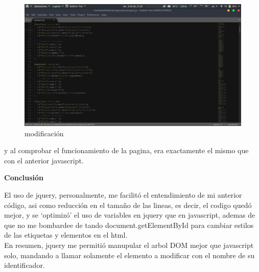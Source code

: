 \documentclass[12pt,letterpaper]{article}
\begin{document}
\begin{flushleft}
\begin{figure}[H]
\begin{minipage}[t]{12cm}
\includegraphics[width=400pt]{./imgs/5.png}
\caption{modificaci\'on}\label{figura 5}
\end{minipage}
\end{figure}

y al comprobar el funcionamiento de la pagina, era exactamente el mismo que con el anterior javascript.

\newpage

{\Huge {\rm {\bf Conclusi\'on}}}

\vspace{2mm}

El uso de jquery, personalmente, me facilit\'o el entendimiento de mi anterior c\'odigo, asi como reducci\'on en el tama\~no de las lineas, es decir, el codigo qued\'o mejor, y se `optimiz\'o' el uso de variables en jquery que en javascript, ademas de que no me bombardee de tando document.getElementById para cambiar estilos de las etiquetas y elementos en el html.\\
En resumen, jquery me permiti\'o manupular el arbol DOM mejor que javascript solo, mandando a llamar solamente el elemento a modificar con el nombre de su identificador.
\end{flushleft}
\end{document}
